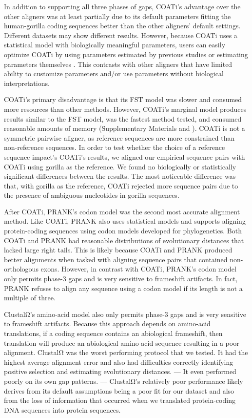 \documentclass[12pt,letterpaper]{article}
\begin{document}
In addition to supporting all three phases of gaps, COATi's advantage over the other aligners was at least partially due to its default parameters fitting the human-gorilla coding sequences better than the other aligners' default settings. Different datasets may show different results. However, because COATi uses a statistical model with biologically meaningful parameters, users can easily optimize COATi by using parameters estimated by previous studies or estimating parameters themselves \citep[e.g.][]{zhu2022profiling}. This contrasts with other aligners that have limited ability to customize parameters and/or use parameters without biological interpretations.

COATi's primary disadvantage is that its FST model was slower and consumed more resources than other methods. However, COATi's marginal model produces results similar to the FST model, was the fastest method tested, and consumed reasonable amounts of memory (Supplementary Materials and \citealt{garcia2023dissertation}).
%
COATi is not a symmetric pairwise aligner, as reference sequences are more constrained than non-reference sequences. In order to test whether the choice of a reference sequence impact's COATi's results, we aligned our empirical sequence pairs with COATi using gorilla as the reference. We found no biologically or statistically significant differences between the results. The most noticeable difference was that, with gorilla as the reference, COATi rejected more sequence pairs due to the presence of ambiguous nucleotides in gorilla sequences.

After COATi, PRANK's codon model was the second most accurate alignment method. Like COATi, PRANK also uses statistical models and supports aligning protein-coding sequences using codon models developed for phylogenetics. Both COATi and PRANK had reasonable distributions of evolutionary distances that lacked large right tails. This is likely because COATi and PRANK produced better alignments when tasked with aligning sequence pairs that contained non-orthologous exons. However, in contrast with COATi, PRANK's codon model only permits phase-3 gaps and is very sensitive to frameshift artifacts. In fact, PRANK refuses to align any sequence using a codon model if its length is not a multiple of three.

ClustalΩ's amino-acid model also only permits phase-3 gaps and is very sensitive to frameshift artifacts. Because this approach depends on amino-acid translations, if a coding sequence contains an abiological frameshift, then translation will produce an abiological amino-acid sequence resulting in a poor alignment. ClustalΩ was the worst performing protocol that we tested. It had the highest average alignment error and also had difficulties correctly identifying positive selection and estimating evolutionary distances.  --- It even performed poorly on its own gap patterns. --- ClustalΩ's relatively poor performance likely derives from its default assumptions being a poor fit for our dataset and also from the loss of information that occurred when we translated protein-coding DNA sequences into protein sequences.
\end{document}
